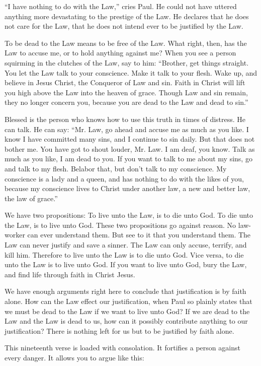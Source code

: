 “I have nothing to do with the Law,” cries Paul. He could not have uttered anything more devastating to the prestige of the Law. He declares that he does not care for the Law, that he does not intend ever to be justified by the Law.

To be dead to the Law means to be free of the Law. What right, then, has the Law to accuse me, or to hold anything against me? When you see a person squirming in the clutches of the Law, say to him: “Brother, get things straight. You let the Law talk to your conscience. Make it talk to your flesh. Wake up, and believe in Jesus Christ, the Conqueror of Law and sin. Faith in Christ will lift you high above the Law into the heaven of grace. Though Law and sin remain, they no longer concern you, because you are dead to the Law and dead to sin.”

Blessed is the person who knows how to use this truth in times of distress. He can talk. He can say: “Mr. Law, go ahead and accuse me as much as you like. I know I have committed many sins, and I continue to sin daily. But that does not bother me. You have got to shout louder, Mr. Law. I am deaf, you know. Talk as much as you like, I am dead to you. If you want to talk to me about my sins, go and talk to my flesh. Belabor that, but don’t talk to my conscience. My conscience is a lady and a queen, and has nothing to do with the likes of you, because my conscience lives to Christ under another law, a new and better law, the law of grace.”

We have two propositions: To live unto the Law, is to die unto God. To die unto the Law, is to live unto God. These two propositions go against reason. No law-worker can ever understand them. But see to it that you understand them. The Law can never justify and save a sinner. The Law can only accuse, terrify, and kill him. Therefore to live unto the Law is to die unto God. Vice versa, to die unto the Law is to live unto God. If you want to live unto God, bury the Law, and find life through faith in Christ Jesus.

We have enough arguments right here to conclude that justification is by faith alone. How can the Law effect our justification, when Paul so plainly states that we must be dead to the Law if we want to live unto God? If we are dead to the Law and the Law is dead to us, how can it possibly contribute anything to our justification? There is nothing left for us but to be justified by faith alone.

This nineteenth verse is loaded with consolation. It fortifies a person against every danger. It allows you to argue like this:

